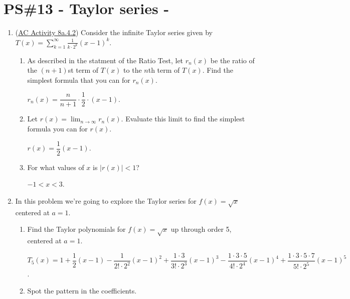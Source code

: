 


%


\allowdisplaybreaks
\section{PS\#13 - Taylor series -  }

\everymath{\displaystyle}
\begin{enumerate}[leftmargin=0pt]


\item (\href{https://faculty.gvsu.edu/boelkinm/Home/ACS/sec-8a-4-taylor-series.html#act-8a-4-1}{AC Activity 8a.4.2}) Consider the infinite Taylor series given by $T(x) = \sum_{k = 1}^{\infty} \frac{1}{k \cdot 2^k}(x-1)^k.$
\begin{enumerate}
    \item As described in the statment of the Ratio Test, let $r_n(x)$ be the ratio of the $(n+1)$st term of $T(x)$ to the $n$th term of $T(x)$. Find the simplest formula that you can for $r_n(x)$.

    \begin{red}
        $r_n(x) = \dfrac{n}{n+1} \cdot \dfrac12 \cdot (x-1).$
    \end{red}
    \item Let $r(x) = \displaystyle\lim_{n\to\infty} r_n(x)$. Evaluate this limit to find the simplest formula you can for $r(x)$.

    \begin{red}
        $r(x) = \dfrac12 (x-1).$
    \end{red}
    \item For what values of $x$ is $|r(x)| < 1$? \begin{red} $-1 < x < 3$.
    \end{red}
\end{enumerate}

\item In this problem we're going to explore the Taylor series for $f(x) = \sqrt{x}$ centered at $a = 1$.
\begin{enumerate}
    \item Find the Taylor polynomials for $f(x) = \sqrt{x}$ up through order 5, centered at $a=1$.

    \begin{red}
        $T_5(x) = 1 
        + \dfrac12 (x-1) 
        - \dfrac{1}{2!\cdot 2^2}(x-1)^2
        + \dfrac{1\cdot 3}{3!\cdot 2^3}(x-1)^3 
        - \dfrac{1\cdot3 \cdot 5}{4!\cdot 2^4}(x-1)^4
        + \dfrac{1\cdot3 \cdot 5\cdot 7}{5!\cdot 2^5}(x-1)^5$.
    \end{red}
    \item Spot the pattern in the coefficients.


\end{enumerate}
\end{enumerate}
